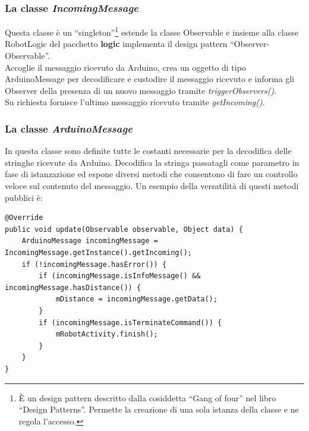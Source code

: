  \subsubsection{La classe \emph{IncomingMessage}}
 Questa classe è un ``singleton''\footnote{È un design pattern descritto dalla 
 cosiddetta ``Gang of four'' nel libro ``Design Patterns''. 
 Permette la creazione di una sola istanza della classe e ne regola l'accesso. } 
 estende la classe Observable e insieme alla classe RobotLogic del 
 pacchetto \textbf{logic} implementa il design pattern ``Observer-Observable''. 
 \\Accoglie il messaggio ricevuto da Arduino, crea un oggetto di tipo ArduinoMessage 
 per decodificare e custodire il messaggio ricevuto e informa gli Observer della presenza 
 di un nuovo messaggio tramite \emph{triggerObservers()}.\\
 Su richiesta fornisce l'ultimo messaggio ricevuto tramite \emph{getIncoming()}.
 \subsubsection{La classe \emph{ArduinoMessage}}
 In questa classe sono definite tutte le costanti necessarie per la 
 decodifica delle stringhe ricevute da Arduino. 
 Decodifica la stringa passatagli come parametro in fase di istanzazione ed 
 espone diversi metodi che consentono di fare un controllo veloce sul contenuto del messaggio.
 Un esempio della versatilità di questi metodi pubblici è:  
 \lstset{language=Java}

\begin{lstlisting}[caption=Metodo \emph{update()} di RobotLogic del 
pacchetto \textbf{logic}]
@Override
public void update(Observable observable, Object data) {
    ArduinoMessage incomingMessage = IncomingMessage.getInstance().getIncoming();
    if (!incomingMessage.hasError()) {
        if (incomingMessage.isInfoMessage() && incomingMessage.hasDistance()) {
            mDistance = incomingMessage.getData();
        }
        if (incomingMessage.isTerminateCommand()) {
            mRobotActivity.finish();
        }
    }
}
\end{lstlisting}

